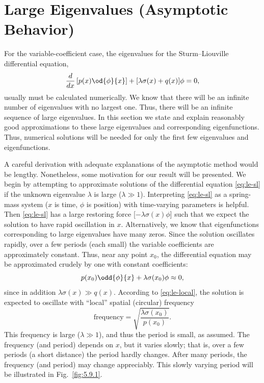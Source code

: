 \section{Large Eigenvalues (Asymptotic Behavior)}
\label{sec:sl-large-eigen}

For the variable-coefficient case, the eigenvalues for the Sturm--Liouville differential equation,
\begin{equation}
\label{eq:le-sl}
\frac{d}{d x}\left[p(x)\od{\phi}{x}\right] + [\lambda\sigma(x) + q(x)]\phi = 0,
\end{equation}
usually must be calculated numerically.  We know that there will be an infinite number of eigenvalues with no largest one.  Thus, there will be an infinite sequence of large eigenvalues.  In this section we state and explain reasonably good approximations to these large eigenvalues and corresponding eigenfunctions.  Thus, numerical solutions will be needed for only the first few eigenvalues and eigenfunctions.

A careful derivation with adequate explanations of the asymptotic method would be lengthy.  Nonetheless, some motivation for our result will be presented.  We begin by attempting to approximate solutions of the differential equation \eqref{eq:le-sl} if the unknown eigenvalue $\lambda$ is large ($\lambda \gg 1$).  Interpreting \eqref{eq:le-sl} as a spring-mass system ($x$ is time, $\phi$ is position) with time-varying parameters is helpful.  Then \eqref{eq:le-sl} has a large restoring force [$-\lambda\sigma(x)\phi$] such that we expect the solution to have rapid oscillation in $x$.  Alternatively, we know that eigenfunctions corresponding to large eigenvalues have many zeros.  Since the solution oscillates rapidly, over a few periods (each small) the variable coefficients are approximately constant.  Thus, near any point $x_0$, the differential equation may be approximated crudely by one with constant coefficients:
\begin{equation}
\label{eq:le-local}
p(x_0)\odd{\phi}{x} + \lambda\sigma(x_0)\phi \approx 0,
\end{equation}
since in addition $\lambda\sigma(x) \gg q(x)$.  According to \eqref{eq:le-local}, the solution is expected to oscillate with ``local'' spatial (circular) frequency
\begin{equation}
\label{eq:le-frequency}
\text{frequency} = \sqrt{\frac{\lambda\sigma(x_0)}{p(x_0)}}.
\end{equation}
This frequency is large ($\lambda \gg 1$), and thus the period is small, as assumed.  The frequency (and period) depends on $x$, but it varies slowly; that is, over a few periods (a short distance) the period hardly changes.  After many periods, the frequency (and period) may change appreciably.  This slowly varying period will be illustrated in Fig.~\ref{fig:5.9.1}.

